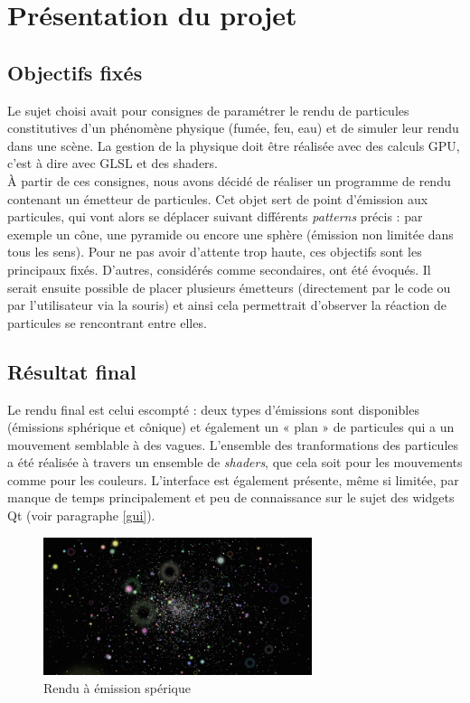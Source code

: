 \chapter{Présentation du projet}

\section{Objectifs fixés}

Le sujet choisi avait pour consignes de paramétrer le rendu de particules
constitutives d'un phénomène physique (fumée, feu, eau) et de simuler leur
rendu dans une scène. La gestion de la physique doit être réalisée avec des
calculs GPU, c'est à dire avec GLSL et des shaders.\\

À partir de ces consignes, nous avons décidé de réaliser un programme de rendu
contenant un émetteur de particules. Cet objet sert de point d'émission aux
particules, qui vont alors se déplacer suivant différents \emph{patterns} précis
: par exemple un cône, une pyramide ou encore une sphère (émission non limitée 
dans tous les sens). Pour ne pas avoir d'attente trop haute, ces objectifs sont
les principaux fixés. D'autres, considérés comme secondaires, ont été évoqués.
Il serait ensuite possible de placer plusieurs émetteurs (directement par le 
code ou par l'utilisateur via la souris) et ainsi cela permettrait d'observer la
réaction de particules se rencontrant entre elles.\\

\section{Résultat final}

Le rendu final est celui escompté : deux types d'émissions sont disponibles
(émissions sphérique et cônique) et également un « plan » de particules qui a un
mouvement semblable à des vagues. L'ensemble des tranformations des particules a
été réalisée à travers un ensemble de \emph{shaders}, que cela soit pour les
mouvements comme pour les couleurs. L'interface est également présente, même si
limitée, par manque de temps principalement et peu de connaissance sur le sujet
des widgets Qt (voir paragraphe \ref{gui}).

\begin{figure}[h]
	\begin{center}
		\includegraphics[width=0.7\textwidth]{img/21-sphere.png}
	\end{center}
	\caption{Rendu à émission spérique}
\end{figure}

